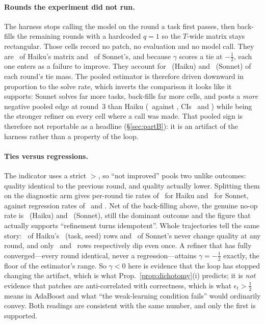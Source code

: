 \paragraph{Rounds the experiment did not run.} The harness stops calling the model on the round a task first passes, then back-fills the remaining rounds with a hardcoded $q{=}1$ so the $T$-wide matrix stays rectangular. Those cells record no patch, no evaluation and no model call. They are \statPBHaikuPadShare\ of Haiku's matrix and \statPBSonnetPadShare\ of Sonnet's, and because $\gamma$ scores a tie at ${-}\frac12$, each one enters as a failure to improve. They account for \statPBHaikuPadTieRange\ (Haiku) and \statPBSonnetPadTieRange\ (Sonnet) of each round's tie mass. The pooled estimator is therefore driven downward in proportion to the solve rate, which inverts the comparison it looks like it supports: Sonnet solves far more tasks, back-fills far more cells, and posts a \emph{more} negative pooled edge at round~3 than Haiku (\statPBSonnetEdge\ against \statPBHaikuEdge, CIs \statPBSonnetEdgeCI\ and \statPBHaikuEdgeCI) while being the stronger refiner on every cell where a call was made. That pooled sign is therefore not reportable as a headline (\S\ref{sec:partB}): it is an artifact of the harness rather than a property of the loop.

\paragraph{Ties versus regressions.} The indicator uses a strict $>$, so ``not improved'' pools two unlike outcomes: quality identical to the previous round, and quality actually lower. Splitting them on the diagnostic arm gives per-round tie rates of \statPBHaikuTieSeries\ for Haiku and \statPBSonnetTieSeries\ for Sonnet, against regression rates of \statPBHaikuRegressSeries\ and \statPBSonnetRegressSeries. Net of the back-filling above, the genuine no-op rate is \statPBHaikuGenuineTieRange\ (Haiku) and \statPBSonnetGenuineTieRange\ (Sonnet), still the dominant outcome and the figure that actually supports ``refinement turns idempotent''. Whole trajectories tell the same story: \statPBHaikuFlat\ of Haiku's \statPBEdgeN\ (task, seed) rows and \statPBSonnetFlat\ of Sonnet's never change quality at any round, and only \statPBHaikuRegressRows\ and \statPBSonnetRegressRows\ rows respectively dip even once. A refiner that has fully converged---every round identical, never a regression---attains $\gamma={-}\frac12$ exactly, the floor of the estimator's range. So $\gamma<0$ here is evidence that the loop has stopped changing the artifact, which is what Prop.~\ref{prop:dichotomy}(i) predicts; it is \emph{not} evidence that patches are anti-correlated with correctness, which is what $\epsilon_t>\frac12$ means in AdaBoost and what ``the weak-learning condition fails'' would ordinarily convey. Both readings are consistent with the same number, and only the first is supported.

